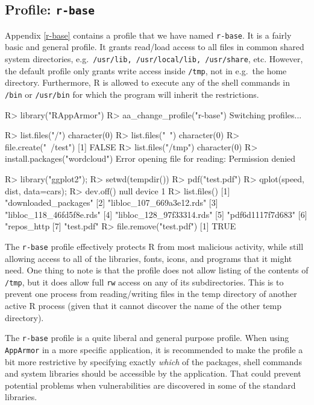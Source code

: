 \documentclass[article]{jss}
\newcommand{\R}{\textsf{R}\xspace}
\newcommand{\AppArmor}{\texttt{AppArmor}\xspace}
\begin{document}
\subsection[Profile: r-base]{Profile: \texttt{r-base}}
\label{r-base-intro}

Appendix \ref{r-base} contains a profile that we have named \texttt{r-base}.
It is a fairly basic and general profile. It grants read/load access to all
files in common shared system directories, e.g.\ \texttt{/usr/lib,
/usr/local/lib, /usr/share}, etc. However, the default profile only grants
write access inside \texttt{/tmp}, not in e.g.\ the home directory. Furthermore,
\R is allowed to execute any of the shell commands in \texttt{/bin}
or \texttt{/usr/bin} for which the program will inherit the restrictions.

\begin{CodeChunk}
\begin{CodeInput}
R> library("RAppArmor")
R> aa_change_profile("r-base")
Switching profiles...

R> list.files("/")
character(0)
R> list.files("~")
character(0)
R> file.create("~/test")
[1] FALSE
R> list.files("/tmp")
character(0)
R> install.packages("wordcloud")
Error opening file for reading: Permission denied

R> library("ggplot2");
R> setwd(tempdir())
R> pdf("test.pdf")
R> qplot(speed, dist, data=cars);
R> dev.off()
null device
          1
R> list.files()
[1] "downloaded_packages"
[2] "libloc_107_669a3e12.rds"
[3] "libloc_118_46fd5f8e.rds"
[4] "libloc_128_97f33314.rds"
[5] "pdf6d1117f7d683"
[6] "repos_http%
[7] "test.pdf"
R> file.remove("test.pdf")
[1] TRUE
\end{CodeInput}
\end{CodeChunk}

The \texttt{r-base} profile effectively protects \R from most malicious
activity, while still allowing access to all of the libraries, fonts, icons, and
programs that it might need. One thing to note is that the profile
does not allow listing of the contents of \texttt{/tmp}, but it does allow full
\texttt{rw} access on any of its subdirectories. This is to prevent one process
from reading/writing files in the temp directory of another active \R process
(given that it cannot discover the name of the other temp directory).

The \texttt{r-base} profile is a quite liberal and general purpose profile. When
using \AppArmor in a more specific application, it is recommended to make the
profile a bit more restrictive by specifying exactly \emph{which} of the
packages, shell commands and system libraries should be accessible by the
application. That could prevent potential problems when vulnerabilities are
discovered in some of the standard libraries.
\end{document}
